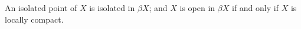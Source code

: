 An isolated point of $X$ is isolated in $\beta X$; and $X$ is open in $\beta X$ if and only if $X$ is locally compact.
